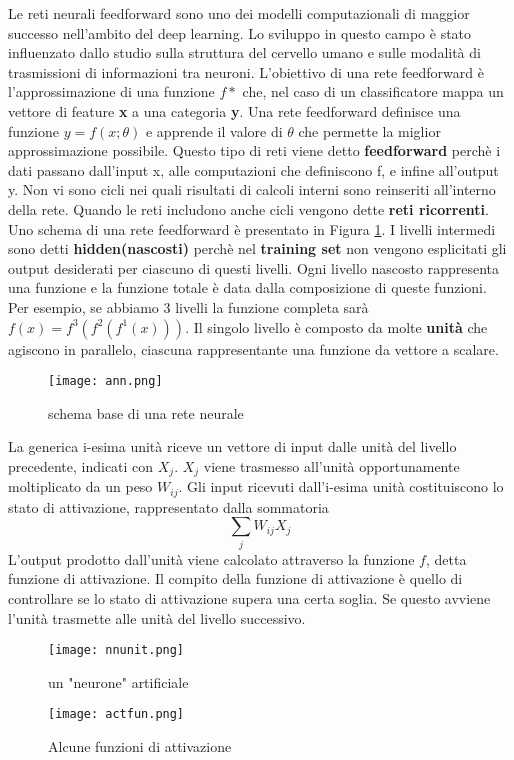 Le reti neurali feedforward sono uno dei modelli computazionali di maggior successo nell'ambito del deep learning. Lo sviluppo in questo campo è stato influenzato  dallo
studio sulla struttura del cervello umano e sulle modalità di trasmissioni di informazioni tra neuroni. L'obiettivo di una rete feedforward  è l'approssimazione di una funzione $f*$ che, nel caso di un classificatore mappa
un vettore di feature \textbf{x} a una categoria \textbf{y}. Una rete feedforward definisce una funzione $y=f(x;\theta)$ e apprende il valore di $\theta$ che permette
la miglior approssimazione possibile. Questo tipo di reti viene detto \textbf{feedforward} perchè i dati passano dall'input x, alle computazioni che definiscono f, e infine all'output y. Non vi sono cicli 
nei quali risultati di calcoli interni sono reinseriti all'interno della rete. Quando le reti includono anche cicli vengono dette \textbf{reti ricorrenti}.
Uno schema di una rete feedforward  è presentato in Figura \ref{fig:ann}. I livelli intermedi sono detti \textbf{hidden(nascosti)} perchè nel \textbf{training set} non vengono esplicitati
gli output desiderati  per ciascuno di questi livelli. Ogni livello nascosto rappresenta una funzione e la funzione totale è data dalla composizione di queste funzioni. Per esempio,
se abbiamo 3 livelli la funzione completa sarà $f(x) = f^{3}(f^{2}(f^{1}(x)))$. Il singolo livello è composto da molte \textbf{unità} che agiscono in parallelo, ciascuna rappresentante una funzione da vettore a scalare\cite{bengio}.
\begin{figure}
  \texttt{[image: ann.png]}
  \caption{schema base di una rete neurale\cite{ann}}
  \label{fig:ann}
\end{figure}

La generica i-esima unità  riceve un vettore di input dalle unità del livello precedente, indicati con $X_j$. $X_j$ viene trasmesso all'unità opportunamente moltiplicato da un peso $W_{ij}$.
Gli input ricevuti dall'i-esima unità costituiscono lo stato di attivazione, rappresentato dalla sommatoria \[\sum_jW_{ij}X_j\] L'output prodotto dall'unità viene calcolato attraverso la funzione $f$, detta funzione di attivazione. Il compito della funzione di attivazione è quello di controllare
se lo stato di attivazione supera una certa soglia. Se questo avviene l'unità trasmette alle unità del livello successivo\cite{mazzetti}.
\begin{figure}
  \texttt{[image: nnunit.png]}
  \caption{un "neurone" artificiale \cite{unit}}
  \label{fig::unit}
\end{figure}
\begin{figure}
  \texttt{[image: actfun.png]}
  \caption{Alcune funzioni di attivazione\cite{act}}
  \label{fig:act}
\end{figure}

